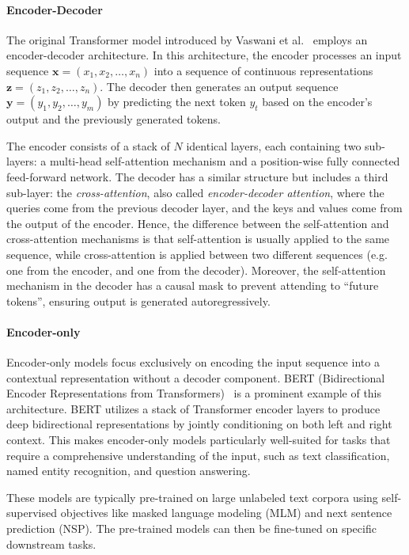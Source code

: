 \paragraph{Encoder-Decoder}

The original Transformer model introduced by Vaswani et al.~\cite{vaswani_attention_2017} employs an encoder-decoder architecture. In this architecture, the encoder processes an input sequence $\mathbf{x} = (x_1, x_2, \dots, x_n)$ into a sequence of continuous representations $\mathbf{z} = (z_1, z_2, \dots, z_n)$. The decoder then generates an output sequence $\mathbf{y} = (y_1, y_2, \dots, y_m)$ by predicting the next token $y_t$ based on the encoder's output and the previously generated tokens.

The encoder consists of a stack of $N$ identical layers, each containing two sub-layers: a multi-head self-attention mechanism and a position-wise fully connected feed-forward network. The decoder has a similar structure but includes a third sub-layer: the \emph{cross-attention}, also called \emph{encoder-decoder attention}, where the queries come from the previous decoder layer, and the keys and values come from the output of the encoder. Hence, the difference between the self-attention and cross-attention mechanisms is that self-attention is usually applied to the same sequence, while cross-attention is applied between two different sequences (e.g. one from the encoder, and one from the decoder). Moreover, the self-attention mechanism in the decoder has a causal mask to prevent attending to ``future tokens'', ensuring output is generated autoregressively.

\paragraph{Encoder-only}

Encoder-only models focus exclusively on encoding the input sequence into a contextual representation without a decoder component. BERT (Bidirectional Encoder Representations from Transformers)~\cite{devlin_bert_2019} is a prominent example of this architecture. BERT utilizes a stack of Transformer encoder layers to produce deep bidirectional representations by jointly conditioning on both left and right context. This makes encoder-only models particularly well-suited for tasks that require a comprehensive understanding of the input, such as text classification, named entity recognition, and question answering.

These models are typically pre-trained on large unlabeled text corpora using self-supervised objectives like masked language modeling (MLM) and next sentence prediction (NSP). The pre-trained models can then be fine-tuned on specific downstream tasks.

